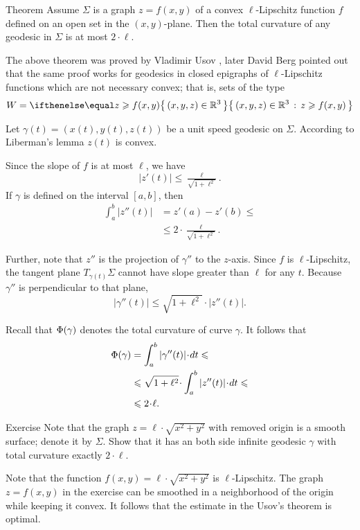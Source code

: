 \begin{thm}{Theorem}\label{thm:usov}
Assume $\Sigma$ is a graph $z=f(x,y)$ of a convex $\ell$-Lipschitz function $f$ defined on an open set in the $(x,y)$-plane.
Then the total curvature of any geodesic in $\Sigma$ is at most $2\cdot \ell$.
\end{thm}

The above theorem was proved by Vladimir Usov \cite{usov},
later David Berg \cite{berg} pointed out that the same proof works for geodesics in closed epigraphs of $\ell$-Lipschitz functions which are not necessary convex; that is, sets of the type 
\[W=\set{(x,y,z)\in\RR^3}{z\ge f(x,y)}\]

Let $\gamma(t)=(x(t),y(t),z(t))$ be a unit speed geodesic on $\Sigma$.
According to Liberman's lemma 
$z(t)$ is convex.

Since the slope of $f$ is at most $\ell$, we have
\[|z'(t)|\le \tfrac{\ell}{\sqrt{1+\ell^2}}.\]
If $\gamma$ is defined on the interval $[a,b]$, then
\begin{align*}
\int_a^b |z''(t)|&=z'(a)-z'(b)\le 
\\
&\le 2\cdot \tfrac{\ell}{\sqrt{1+\ell^2}}.
\end{align*}

Further, note that $z''$ is the projection of $\gamma''$ to the $z$-axis.
Since $f$ is $\ell$-Lipschitz, the tangent plane $T_{\gamma (t)} \Sigma$ cannot have slope greater than $\ell$ for any $t$.
Because $\gamma ''$ is perpendicular to that plane, 
\[|\gamma'' (t)|  \le \sqrt{1+ \ell ^2} \cdot|z''(t)| .\]

Recall that $\Phi({\gamma})$ denotes the total curvature of curve $\gamma$.
It follows that 
\begin{align*}
\tc\gamma&=\int_a^b|\gamma'' (t)|\cdot dt\le 
\\
&\le \sqrt{1+ \ell ^2}\cdot  \int_a^b |z''(t)|\cdot dt\le 
\\
&\le 2\cdot \ell.
\end{align*}
\qedsf

\begin{thm}{Exercise}
Note that the graph $z=\ell\cdot\sqrt{x^2+y^2}$ with removed origin is a smooth surface; denote it by $\Sigma$.
Show that it has an both side infinite geodesic $\gamma$ with total curvature exactly $2\cdot \ell$.
\end{thm}

Note that the function $f(x,y)=\ell\cdot\sqrt{x^2+y^2}$ is $\ell$-Lipschitz.
The graph $z=f(x,y)$ in the exercise can be smoothed in a neighborhood of the origin while keeping it convex.
It follows that the estimate in the Usov's theorem is optimal.


